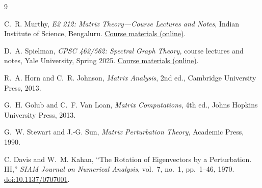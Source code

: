 \documentclass[14pt,letterpaper]{article}
\theoremstyle{plain}
\theoremstyle{definition}
\theoremstyle{remark}
\begin{document}
\clearpage
{}
{}

\begin{thebibliography}{9}

C.~R. Murthy,
\emph{E2 212: Matrix Theory---Course Lectures and Notes},
Indian Institute of Science, Bengaluru.
\href{https://ece.iisc.ac.in/~cmurthy/e2-212-matrix-theory-video-lectures-and-notes-2/}
{Course materials (online)}.

D.~A. Spielman,
\emph{CPSC 462/562: Spectral Graph Theory},
course lectures and notes, Yale University, Spring 2025.
\href{https://www.cs.yale.edu/homes/spielman/462/462schedule.html}
{Course materials (online)}.

R.~A. Horn and C.~R. Johnson,
\emph{Matrix Analysis}, 2nd ed.,
Cambridge University Press, 2013.

G.~H. Golub and C.~F. Van Loan,
\emph{Matrix Computations}, 4th ed.,
Johns Hopkins University Press, 2013.

G.~W. Stewart and J.-G. Sun,
\emph{Matrix Perturbation Theory},
Academic Press, 1990.

C. Davis and W.~M. Kahan,
``The Rotation of Eigenvectors by a Perturbation. III,''
\emph{SIAM Journal on Numerical Analysis},
vol.~7, no.~1, pp.~1--46, 1970.
\href{https://doi.org/10.1137/0707001}{doi:10.1137/0707001}.

\end{thebibliography}
\end{document}
